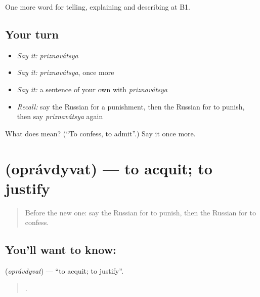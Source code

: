 \begin{grammarlens}[title={What you've built}]
One more word for telling, explaining and describing at B1.
\end{grammarlens}

\subsection*{Your turn}
\begin{itemize}
\raggedright
  \item \emph{Say it:} \emph{priznavátsya}
  \item \emph{Say it:} \emph{priznavátsya}, once more
  \item \emph{Say it:} a sentence of your own with \emph{priznavátsya}
  \item \emph{Recall:} say the Russian for a punishment, then the Russian for to punish, then say \emph{priznavátsya} again
\end{itemize}

\begin{tcolorbox}[breakable,colback=teal!4,colframe=teal!35!black,title={Before you move on}]
What does  mean? (\textquotedblleft{}To confess, to admit\textquotedblright{}.) Say it once more.
\end{tcolorbox}
\section[\texorpdfstring{\ru{оправдывать} (oprávdyvat)}{оправдывать (oprávdyvat)}]{ (oprávdyvat) — to acquit; to justify}

\label{lesson:RU-C294-opravdyvat}



\begin{quote}
Before the new one: say the Russian for to punish, then the Russian for to confess.
\end{quote}

\subsection*{You'll want to know: }
\textbf{} (\emph{oprávdyvat}) — \textquotedblleft{}to acquit; to justify\textquotedblright{}.

\begin{quote}
   .
\end{quote}


